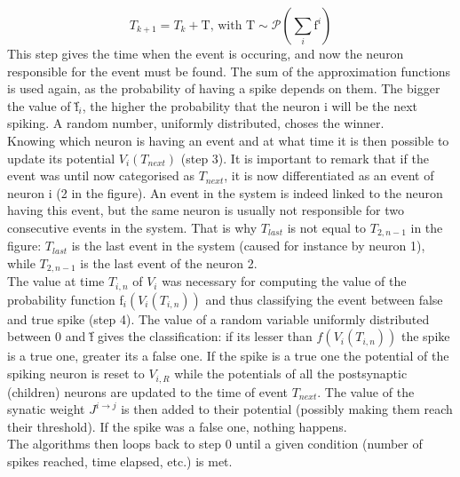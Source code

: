 	\begin{equation}
		T_{k+1}=T_k+\text{\~T}\text{, with \~T}\sim\mathscr{P}(\sum_i\text{\~f}^i)
	\end{equation}
	This step gives the time when the event is occuring, and now the neuron responsible for the event must be found. The sum of the approximation functions is used again, as the probability of having a spike depends on them. The bigger the value of \~f$_i$, the higher the probability that the neuron i will be the next spiking. A random number, uniformly distributed, choses the winner.\\\indent
	Knowing which neuron is having an event and at what time it is then possible to update its potential $V_i(T_{next})$ (step 3). It is important to remark that if the event was until now categorised as $T_{next}$, it is now differentiated as an event of neuron i (2 in the figure). An event in the system is indeed linked to the neuron having this event, but the same neuron is usually not responsible for two consecutive events in the system. That is why $T_{last}$ is not equal to $T_{2,n-1}$ in the figure: $T_{last}$ is the last event in the system (caused for instance by neuron 1), while $T_{2,n-1}$ is the last event of the neuron 2.\\\indent
	The value at time $T_{i,n}$ of $V_i$ was necessary for computing the value of the probability function f$_i(V_i(T_{i,n}))$ and thus classifying the event between false and true spike (step 4). The value of a random variable uniformly distributed between 0 and \~f gives the classification: if its lesser than $f(V_i(T_{i,n}))$ the spike is a true one, greater its a false one. If the spike is a true one the potential of the spiking neuron is reset to $V_{i,R}$ while the potentials of all the postsynaptic (children) neurons are updated to the time of event $T_{next}$. The value of the synatic weight $J^{i\rightarrow j}$ is then added to their potential (possibly making them reach their threshold). If the spike was a false one, nothing happens.\\\indent
	The algorithms then loops back to step 0 until a given condition (number of spikes reached, time elapsed, etc.) is met.\\\indent
